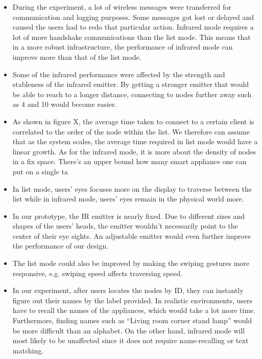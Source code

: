 \begin{itemize}
\item During the experiment, a lot of wireless messages were transferred for communication and logging purposes. Some messages got lost or delayed and caused the users had to redo that particular action. Infrared mode requires a lot of more handshake communications than the list mode. This means that in a more robust infrastructure, the performance of infrared mode can improve more than that of the list mode.

\item Some of the infrared performance were affected by the strength and stableness of the infrared emitter. By getting a stronger emitter that would be able to reach to a longer distance, connecting to nodes further away such as 4 and 10 would become easier.

\item As shown in figure X, the average time taken to connect to a certain client is correlated to the order of the node within the list. We therefore can assume that as the system scales, the average time required in list mode would have a linear growth. As for the infrared mode, it is more about the density of nodes in a fix space. There’s an upper bound how many smart appliance one can put on a single ta

\item In list mode, users’ eyes focuses more on the display to traverse between the list while in infrared mode, users’ eyes remain in the physical world more.

\item In our prototype, the IR emitter is nearly fixed. Due to different sizes and shapes of the users’ heads, the emitter wouldn’t necessarily point to the center of their eye sights. An adjustable emitter would even further improve the performance of our design.

\item The list mode could also be improved by making the swiping gestures more responsive, e.g. swiping speed affects traversing speed.

\item In our experiment, after users locates the nodes by ID, they can instantly figure out their names by the label provided. In realistic environments, users have to recall the names of the appliances, which would take a lot more time. Furthermore, finding names such as “Living room corner stand lamp” would be more difficult than an alphabet. On the other hand, infrared mode will most likely to be unaffected since it does not require name-recalling or text matching.

 \end{itemize}